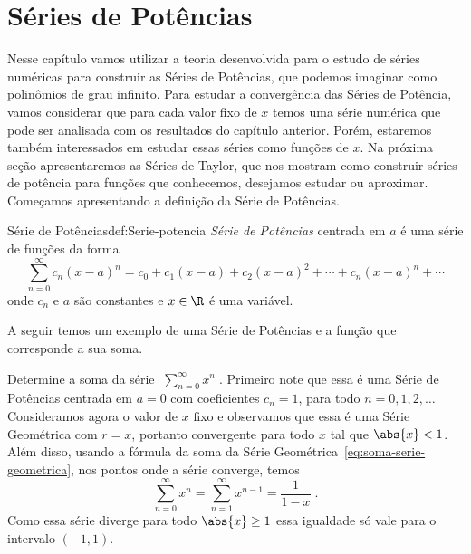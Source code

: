 \section{Séries de Potências}

Nesse capítulo vamos utilizar a teoria desenvolvida para o estudo de séries numéricas
para construir as Séries de Potências, que podemos imaginar como polinômios de
grau infinito.
Para estudar a convergência das Séries de Potência, vamos considerar que para
cada valor fixo de $x$ temos uma série numérica que pode ser analisada com
os resultados do capítulo anterior. Porém,
estaremos também interessados em estudar essas séries como funções de $x$.
Na próxima seção apresentaremos as Séries de Taylor, que nos mostram
como construir séries de potência para funções que conhecemos,
desejamos estudar ou aproximar.
Começamos apresentando a definição da Série de Potências.

\begin{definicao}{Série de Potências}{def:Serie-potencia}
  \emph{Série de Potências} centrada em $a$
  é uma série de funções da forma
  \[
  	\sum_{n=0}^\infty c_n(x-a)^n = c_0 + c_1(x-a) + c_2(x-a)^2
                                 + \cdots + c_n(x-a)^n + \cdots
 	\]
  onde $c_n$ e $a$ são constantes e $x\in\R$ é uma variável.
\end{definicao}

A seguir temos um exemplo de uma Série de Potências e a função que corresponde
a sua soma.

\begin{example}
  Determine a soma da série
  \(\;
    \sum_{n=0}^\infty x^n   \;.
  \)
  \solution
  Primeiro note que essa é uma Série de Potências centrada em $a=0$
  com coeficientes $c_n=1$, para todo $n=0, 1, 2,\dots$
  Consideramos agora o valor de $x$ fixo e observamos que essa é uma Série Geométrica
  com $r=x$, portanto convergente para todo $x$ tal que $\abs{x}<1$.
  Além disso, usando a fórmula da
  soma da Série Geométrica~\eqref{eq:soma-serie-geometrica},
  nos pontos onde a série converge, temos
  \[
  	\sum_{n=0}^\infty x^n = \sum_{n=1}^\infty x^{n-1} = \frac{1}{1-x}  \;.
 	\]
 	Como essa série diverge para todo $\abs{x}\geq 1$ essa igualdade só vale
  para o intervalo $(-1, 1)$.
\end{example}

